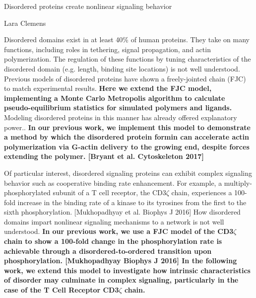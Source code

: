 \documentclass[onecolumn]{article}
\begin{document}
\newcommand{\citel}[1]{\citep{#1}}
\newcommand{\citelt}[1]{\citet{#1}}

\def\Tevac{T_{1/2}^{\mbox{\,\scriptsize evac}}}
\def\Treturn{T_{1/2}^{\mbox{\,\scriptsize return}}}
\def\toffbar{\bar{t}_{\mbox{\scriptsize off}}}
\def\toff{{t}_{\mbox{\scriptsize off}}}
\def\Peclet{P\'{e}clet}


\begin{center}
\Large
Disordered proteins create nonlinear signaling behavior

\large
Lara Clemens
\date{}

\end{center}
\normalsize


Disordered domains exist in at least 40\% of human proteins. 
They take on many functions, including roles in tethering, signal propagation, and actin polymerization. 
The regulation of these functions by tuning characteristics of the disordered domain (e.g. length, binding site locations) is not well understood.  
Previous models of disordered proteins have shown a freely-jointed chain (FJC) to match experimental results. 
\textbf{Here we extend the FJC model, implementing a Monte Carlo Metropolis algorithm to calculate pseudo-equilibrium statistics for simulated polymers and ligands. }
Modeling disordered proteins in this manner has already offered explanatory power.. \textbf{In our previous work, we implement this model to demonstrate a method by which the disordered protein formin can accelerate actin polymerization via G-actin delivery to the growing end, despite forces extending the polymer. [Bryant et al. Cytoskeleton 2017] }

Of particular interest, disordered signaling proteins can exhibit complex signaling behavior such as cooperative binding rate enhancement. For example, a multiply-phosphorylated subunit of a T cell receptor, the CD3$\zeta$ chain, experiences a 100-fold increase in the binding rate of a kinase to its tyrosines from the first to the sixth phosphorylation. [Mukhopadhyay et al. Biophys J 2016] How disordered domains impart nonlinear signaling mechanisms to a network is not well understood. \textbf{In our previous work, we use a FJC model of the CD3$\zeta$ chain to show a 100-fold change in the phosphorylation rate is achievable through a disordered-to-ordered transition upon phosphorylation. [Mukhopadhyay Biophys J 2016] In the following work, we extend this model to investigate how intrinsic characteristics of disorder may culminate in complex signaling, particularly in the case of the T Cell Receptor CD3$\zeta$ chain.}
\end{document}
